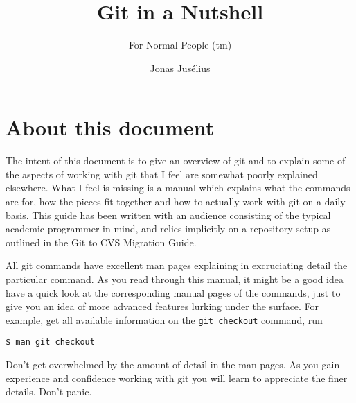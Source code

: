 \documentclass[a4paper,10pt]{article}
\begin{document}
\pagestyle{fancy}
\fancyfoot{}
\fancyhead{}
\renewcommand{\sectionmark}[1]{\markboth{\sf\thesection.\ #1}{}}
\renewcommand{\subsectionmark}[1]{}
\fancyhead[R]{{\rmfamily\thepage}}
\newcommand{\Ref}[1]{section~\ref{#1}, p.~\pageref{#1}}

\title{Git in a Nutshell}

\subtitle{For Normal People (tm)}
\author{{\sf Jonas Jus\'elius}}
\address{
{\tt <jonas.juselius@chem.uit.no>}\\
{\sf Centre for Theoretical and Computational Chemistry}\\
{\sf University of Tromsø}\\
{\sf N-9037 University of Tromsø, Norway}
}


\maketitle
\tableofcontents
\newpage

\section*{About this document}
The intent of this document is to give an overview of git and to explain some of
the aspects of working with git that I feel are somewhat poorly explained
elsewhere. 
What I feel is missing is a manual which explains what the commands are for,
how the pieces fit together and how to actually work with git on a daily
basis. This guide has been written with an audience consisting of the typical
academic programmer in mind, and relies implicitly on a repository setup as
outlined in the Git to CVS Migration Guide.

All git commands have excellent man pages explaining in
excruciating detail the particular command. As you read through this manual,
it might be a good idea have a quick look at the corresponding manual pages of
the commands, just to give you an idea of more advanced features lurking under
the surface. For example, get all available information on the
\texttt{git checkout} command, run
\begin{verbatim}
$ man git checkout
\end{verbatim}
Don't get overwhelmed by the amount of detail in the man pages. As
you gain experience and confidence working with git you will learn to
appreciate the finer details. Don't panic.
\end{document}
